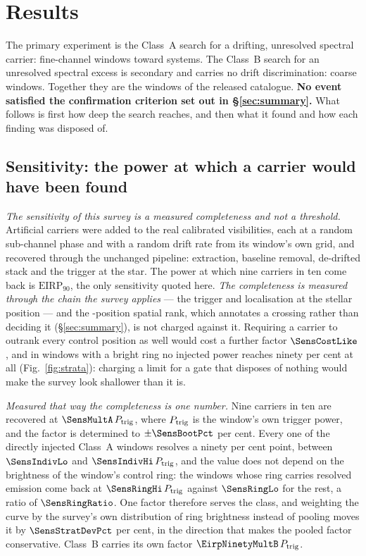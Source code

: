 \section{Results}
\label{sec:results}

The primary experiment is the Class~A search for a drifting, unresolved
spectral carrier: \NWinA{} fine-channel windows toward \NSysClassA{}
systems. The Class~B search for an unresolved spectral excess is secondary
and carries no drift discrimination: \NWinB{} coarse windows. Together they
are the \NWindows{} windows of the released catalogue. \textbf{No event
satisfied the confirmation criterion set out in \S\ref{sec:summary}.} What
follows is first how deep the search reaches, and then what it found and how
each finding was disposed of.

\subsection{Sensitivity: the power at which a carrier would have been
found} \label{sec:pninetysel}

\emph{The sensitivity of this survey is a measured completeness and not a
threshold.} Artificial carriers were added to the real calibrated
visibilities, each at a random sub-channel phase and with a random drift rate
from its window's own grid, and recovered through the unchanged pipeline:
extraction, baseline removal, de-drifted stack and the trigger at the star.
The power at which nine carriers in ten come back is $\mathrm{EIRP}_{90}$,
the only sensitivity quoted here. \emph{The completeness is measured through
the chain the survey applies} --- the trigger and localisation at the stellar
position --- and the \NCtrl-position spatial rank, which annotates a crossing
rather than deciding it (\S\ref{sec:summary}), is not charged against it.
Requiring a carrier to outrank every control position as well would cost a
further factor $\SensCostLike$, and in \SensNRingHiUnres{} windows with a
bright ring no injected power reaches ninety per cent at all
(Fig.~\ref{fig:strata}): charging a limit for a gate that disposes of nothing
would make the survey look shallower than it is.

\emph{Measured that way the completeness is one number.} Nine carriers in ten
are recovered at $\SensMultA\,P_{\rm trig}$, where $P_{\rm trig}$ is the
window's own trigger power, and the factor is determined to
$\pm\SensBootPct$ per cent. Every one of the \SensNInj{} directly injected
Class~A windows resolves a ninety per cent point, between $\SensIndivLo$ and
$\SensIndivHi\,P_{\rm trig}$, and the value does not depend on the brightness
of the window's control ring: the \SensNRingHi{} windows whose ring carries
resolved emission come back at $\SensRingHi\,P_{\rm trig}$ against
$\SensRingLo$ for the rest, a ratio of $\SensRingRatio$. One factor therefore
serves the class, and weighting the curve by the survey's own distribution of
ring brightness instead of pooling moves it by $\SensStratDevPct$ per cent,
in the direction that makes the pooled factor conservative. Class~B carries
its own factor $\EirpNinetyMultB\,P_{\rm trig}$.

